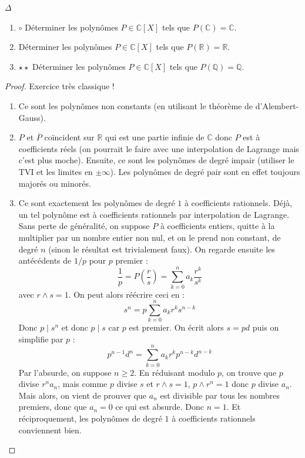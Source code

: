 \documentclass[french,a4paper]{article}
\newcommand{\Q}{\mathbb{Q}}
\newcommand{\R}{\mathbb{R}}
\newcommand{\C}{\mathbb{C}}
\theoremstyle{plain}
\theoremstyle{definition}
\theoremstyle{remark}
\begin{document}
\begin{ex}{$\Delta$}
	\begin{enumerate}
		\item $\circ$ Déterminer les polynômes $P\in\C[X]$ tels que $P(\C)=\C$.
		\item Déterminer les polynômes $P\in\C[X]$ tels que $P(\R)=\R$.
		\item $\star\star$ Déterminer les polynômes $P\in\C[X]$ tels que $P(\Q)=\Q$.
	\end{enumerate}
\end{ex}
\begin{proof}
	Exercice très classique !
	\begin{enumerate}
		\item Ce sont les polynômes non constants (en utilisant le théorème de d'Alembert-Gauss).
		\item $P$ et $\overline{P}$ coïncident sur $\R$ qui est une partie infinie de $\C$ donc $P$ est à coefficients réels (on pourrait le faire avec une interpolation de Lagrange mais c'est plus moche). Ensuite, ce sont les polynômes de degré impair (utiliser le TVI et les limites en $\pm\infty$). Les polynômes de degré pair sont en effet toujours majorés ou minorés.
		\item Ce sont exactement les polynômes de degré $1$ à coefficients rationnels. Déjà, un tel polynôme est à coefficients rationnels par interpolation de Lagrange. Sans perte de généralité, on suppose $P$ à coefficients entiers, quitte à la multiplier par un nombre entier non nul, et on le prend non constant, de degré $n$ (sinon le résultat est trivialement faux). On regarde ensuite les antécédents de $1/p$ pour $p$ premier : $$\frac{1}{p}=P\left(\frac{r}{s}\right)=\sum_{k=0}^{n}a_k\frac{r^k}{s^k}$$ avec $r\wedge s=1$. On peut alors réécrire ceci en : $$s^n=p\sum_{k=0}^{n}a_kr^ks^{n-k}$$ Donc $p\mid s^n$ et donc $p\mid s$ car $p$ est premier. On écrit alors $s=pd$ puis on simplifie par $p$ : $$p^{n-1}d^n=\sum_{k=0}^{n}a_kr^kp^{n-k}d^{n-k}$$ Par l'absurde, on suppose $n\geqslant 2$. En réduisant modulo $p$, on trouve que $p$ divise $r^na_n$, mais comme $p$ divise $s$ et $r\wedge s=1$, $p\wedge r^n=1$ donc $p$ divise $a_n$. Mais alors, on vient de prouver que $a_n$ est divisible par tous les nombres premiers, donc que $a_n=0$ ce qui est absurde. Donc $n=1$. Et réciproquement, les polynômes de degré $1$ à coefficients rationnels conviennent bien.
	\end{enumerate}
\end{proof}
\end{document}
